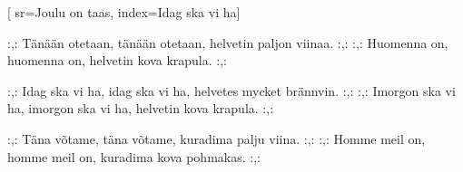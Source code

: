 [ 						
	sr={Joulu on taas},
	index={Idag ska vi ha}]		
	
\beginverse*						
:,: Tänään otetaan, tänään otetaan, 
helvetin paljon viinaa. :,:
:,: Huomenna on, huomenna on,
helvetin kova krapula. :,:
\endverse						

\beginverse				
:,: Idag ska vi ha, idag ska vi ha,
helvetes mycket brännvin. :,:
:,: Imorgon ska vi ha, imorgon ska vi ha,
helvetin kova krapula. :,:
\endverse
		

\beginverse				
:,: Täna võtame, täna võtame,
kuradima palju viina. :,:
:,: Homme meil on, homme meil on,
kuradima kova pohmakas. :,:

\endverse			
\endsong		
